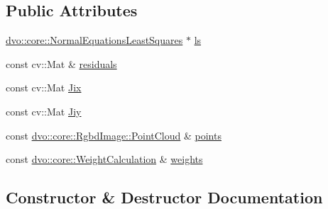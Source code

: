 \subsection*{Public Attributes}
\begin{DoxyCompactItemize}
\item 
\mbox{\hyperlink{classdvo_1_1core_1_1_normal_equations_least_squares}{dvo\+::core\+::\+Normal\+Equations\+Least\+Squares}} $\ast$ \mbox{\hyperlink{structdvo_1_1_least_squares_equations_reduction_a3af436ffa51a579212c4e1e913a4350b}{ls}}
\item 
const cv\+::\+Mat \& \mbox{\hyperlink{structdvo_1_1_least_squares_equations_reduction_a6140e6f4c600016951877b7f79efeec1}{residuals}}
\item 
const cv\+::\+Mat \mbox{\hyperlink{structdvo_1_1_least_squares_equations_reduction_a513436c876416261efe1d99188f8117a}{Jix}}
\item 
const cv\+::\+Mat \mbox{\hyperlink{structdvo_1_1_least_squares_equations_reduction_a7d8b6e08f0baf9580e0d5eb00776911f}{Jiy}}
\item 
const \mbox{\hyperlink{structdvo_1_1core_1_1_rgbd_image_a56820965eb98427d06e6733fe333cdc5}{dvo\+::core\+::\+Rgbd\+Image\+::\+Point\+Cloud}} \& \mbox{\hyperlink{structdvo_1_1_least_squares_equations_reduction_a31ca8e056a271c3f3c99140e679a55c1}{points}}
\item 
const \mbox{\hyperlink{classdvo_1_1core_1_1_weight_calculation}{dvo\+::core\+::\+Weight\+Calculation}} \& \mbox{\hyperlink{structdvo_1_1_least_squares_equations_reduction_a135763297b1e3bcee21189e0f5014fe4}{weights}}
\end{DoxyCompactItemize}


\subsection{Constructor \& Destructor Documentation}
\mbox{\label{structdvo_1_1_least_squares_equations_reduction_ae69114a4911fd35ce60a4696d15ce5a1}} 

